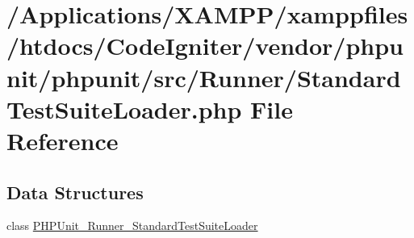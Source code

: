 \hypertarget{_standard_test_suite_loader_8php}{}\section{/\+Applications/\+X\+A\+M\+P\+P/xamppfiles/htdocs/\+Code\+Igniter/vendor/phpunit/phpunit/src/\+Runner/\+Standard\+Test\+Suite\+Loader.php File Reference}
\label{_standard_test_suite_loader_8php}
\subsection*{Data Structures}
\begin{DoxyCompactItemize}
\item 
class \mbox{\hyperlink{class_p_h_p_unit___runner___standard_test_suite_loader}{P\+H\+P\+Unit\+\_\+\+Runner\+\_\+\+Standard\+Test\+Suite\+Loader}}
\end{DoxyCompactItemize}
